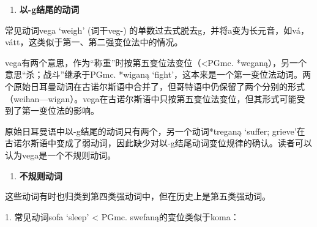 \begin{enumerate}
  \def\labelenumi{\arabic{enumi})}
  \setcounter{enumi}{1}
  \item
        \textbf{以-g结尾的动词}
\end{enumerate}

常见动词vega `weigh‌' (词干veg-)
的单数过去式脱去g，并将a变为长元音，如vá，vátt，这类似于第一、第二强变位法中的情况。

vega有两个意思，作为``称重''时按第五变位法变位（\textless PGmc.
*weganą），另一个意思``杀；战斗''继承于PGmc. *wiganą
`fight'，这本来是一个第一变位法动词。两个原始日耳曼动词在古诺尔斯语中合并了，但哥特语中仍保留了两个分别的形式（weihan---wigan）。vega在古诺尔斯语中只按第五变位法变位，但其形式可能受到了第一变位法的影响。

原始日耳曼语中以-g结尾的动词只有两个，另一个动词*treganą `suffer;
grieve'在古诺尔斯语中变成了弱动词，因此缺少对以-g结尾动词变位规律的确认。读者可以认为vega是一个不规则动词。

\begin{enumerate}
  \def\labelenumi{\arabic{enumi})}
  \setcounter{enumi}{2}
  \item
        \textbf{不规则动词}
\end{enumerate}

这些动词有时也归类到第四类强动词中，但在历史上是第五类强动词。

1. 常见动词sofa `sleep‌' \textless{} PGmc. swefaną的变位类似于koma：

